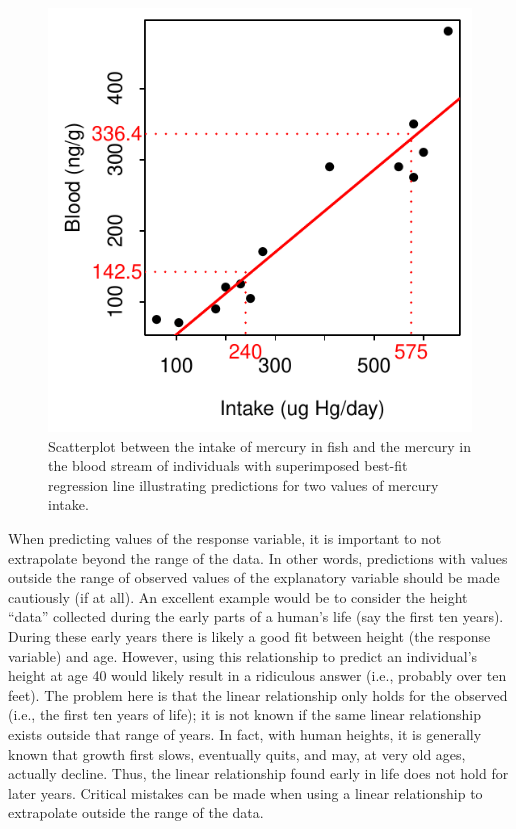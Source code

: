 \documentclass[10pt,openany]{book}\usepackage[]{graphicx}\usepackage[]{color}
\newenvironment{knitrout}{}{} %
\begin{document}
\begin{knitrout}
\color{fgcolor}\begin{figure}[hbtp]

{\centering \includegraphics[width=.4\linewidth]{Figs/HGpredict-1} 

}

\caption[Scatterplot between the intake of mercury in fish and the mercury in the blood stream of individuals with superimposed best-fit regression line illustrating predictions for two values of mercury intake]{Scatterplot between the intake of mercury in fish and the mercury in the blood stream of individuals with superimposed best-fit regression line illustrating predictions for two values of mercury intake.}\label{fig:HGpredict}
\end{figure}


\end{knitrout}


\vspace{-12pt}

When predicting values of the response variable, it is important to not extrapolate beyond the range of the data.  In other words, predictions with values outside the range of observed values of the explanatory variable should be made cautiously (if at all).  An excellent example would be to consider the height ``data'' collected during the early parts of a human's life (say the first ten years).  During these early years there is likely a good fit between height (the response variable) and age.  However, using this relationship to predict an individual's height at age 40 would likely result in a ridiculous answer (i.e., probably over ten feet).  The problem here is that the linear relationship only holds for the observed (i.e., the first ten years of life); it is not known if the same linear relationship exists outside that range of years.  In fact, with human heights, it is generally known that growth first slows, eventually quits, and may, at very old ages, actually decline.  Thus, the linear relationship found early in life does not hold for later years.  Critical mistakes can be made when using a linear relationship to extrapolate outside the range of the data.
\end{document}

